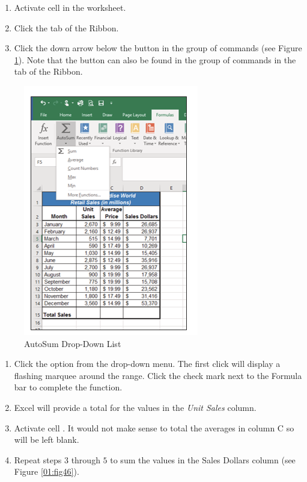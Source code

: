 \begin{enumerate}
	\item Activate cell  in the  worksheet.
	\item Click the  tab of the Ribbon.
	\item Click the down arrow below the  button in the  group of commands (see Figure \ref{01:fig45}). Note that the  button can also be found in the  group of commands in the  tab of the Ribbon.
\end{enumerate}

\begin{figure}[H]
	\centering
	\includegraphics[width=\maxwidth{.95\linewidth}]{gfx/ch01_fig45}
	\caption{AutoSum Drop-Down List}
	\label{01:fig45}
\end{figure}

\begin{enumerate}[resume]
	\item Click the  option from the  drop-down menu. The first click will display a flashing marquee around the range. Click the check mark next to the Formula bar to complete the function.
	\item Excel will provide a total for the values in the \textit{Unit Sales} column.
	\item Activate cell . It would not make sense to total the averages in column C so  will be left blank.
	\item Repeat steps $ 3 $ through $ 5 $ to sum the values in the Sales Dollars column (see Figure \ref{01:fig46}).
\end{enumerate}


